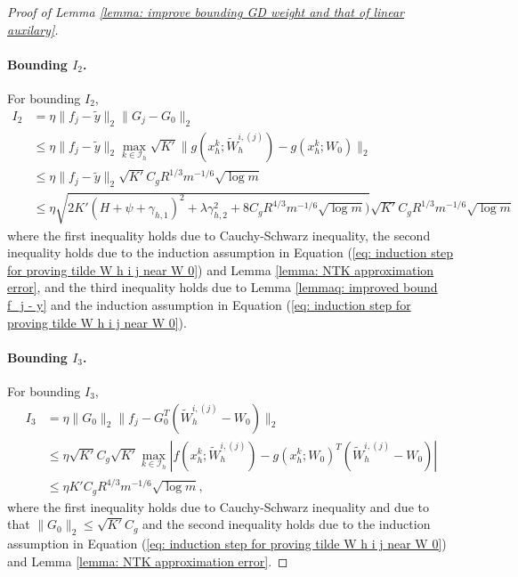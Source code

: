 \documentclass{article} \usepackage{iclr2023/iclr2023_conference,times}
\begin{document}
\begin{proof}[Proof of Lemma \ref{lemma: improve bounding GD weight and that of linear auxilary}]
\paragraph{Bounding $I_2$.} For bounding $I_2$,
\begin{align*}
    I_2 &= \eta \|f_j - \tilde{y} \|_2 \| G_j - G_0 \|_2 \\
    &\leq \eta \|f_j - \tilde{y} \|_2  \max_{k \in \mathcal{I}_h} \sqrt{K'} \|g(x^k_h; \tilde{W}_h^{i,(j)}) - g(x^k_h; W_0) \|_2 \\ 
    &\leq \eta \|f_j - \tilde{y} \|_2 \sqrt{K'} C_g R^{1/3} m^{-1/6} \sqrt{ \log m} \\
    &\leq \eta \sqrt{ 2 K'(H + \psi + \gamma_{h,1} )^2 + \lambda \gamma_{h,2}^2 + 8 C_g R^{4/3} m^{-1/6} \sqrt{ \log m})} \sqrt{K'} C_g R^{1/3} m^{-1/6} \sqrt{ \log m}
\end{align*}
where the first inequality holds due to Cauchy-Schwarz inequality, the second inequality holds due to the induction assumption in Equation (\ref{eq: induction step for proving tilde W h i j near W 0}) and Lemma \ref{lemma: NTK approximation error}, and the third inequality holds due to Lemma \ref{lemmaq: improved bound f_j - y} and the induction assumption in Equation (\ref{eq: induction step for proving tilde W h i j near W 0}). 
\paragraph{Bounding $I_3$.} For bounding $I_3$,
\begin{align*}
I_3 &= \eta \| G_0\|_2 \| f_j - G_0^T ( \tilde{W}_h^{i,(j)} - W_0) \|_2 \\ 
&\leq \eta \sqrt{K'} C_g  \sqrt{K'} \max_{k \in \mathcal{I}_h}| f(x^k_h; \tilde{W}_h^{i, (j)}) - g(x^k_h; W_0)^T ( \tilde{W}_h^{i,(j)} - W_0) | \\ 
&\leq \eta K' C_g R^{4/3} m^{-1/6} \sqrt{\log m},
\end{align*}
where the first inequality holds due to Cauchy-Schwarz inequality and due to that $\| G_0 \|_2 \leq \sqrt{K'} C_g$ and the second inequality holds due to the induction assumption in Equation (\ref{eq: induction step for proving tilde W h i j near W 0}) and Lemma \ref{lemma: NTK approximation error}. 


\end{proof}
\end{document}
